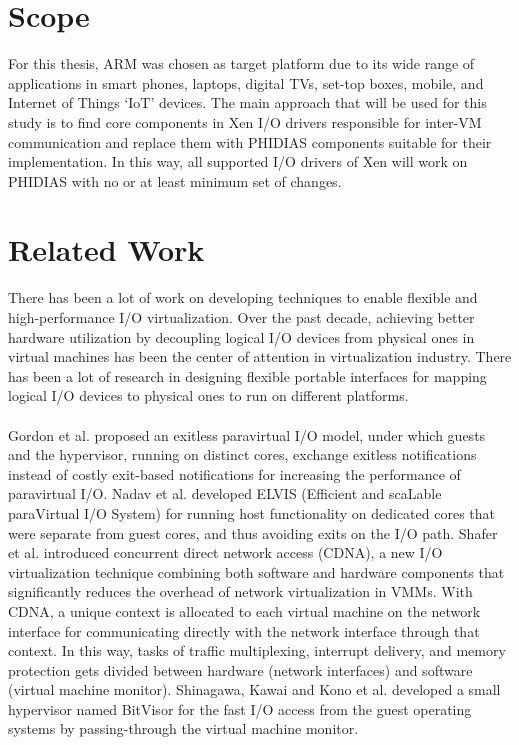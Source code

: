 \section{Scope\label{sec:scope}}
For this thesis, ARM was chosen as target platform due to its wide range of applications in smart phones, laptops, digital TVs, set-top boxes, mobile, and Internet of Things `IoT' devices. The main approach that will be used for this study is to find core components in Xen I/O drivers responsible for inter-VM communication and replace them with PHIDIAS components suitable for their implementation. In this way, all supported I/O drivers of Xen will work on PHIDIAS with no or at least minimum set of changes. 

\section{Related Work\label{sec:prework}}
There has been a lot of work on developing techniques to enable flexible and high-performance I/O virtualization. Over the past decade, achieving better hardware utilization by decoupling logical I/O devices from physical ones in virtual machines has been the center of attention in virtualization industry. There has been a lot of research in designing flexible portable interfaces for mapping logical I/O devices to physical ones to run on different platforms. 
\\
\\
Gordon et al. \cite{exitless} proposed an exitless paravirtual I/O model, under which guests and the hypervisor, running on distinct cores, exchange exitless notifications instead of costly exit-based notifications for increasing the performance of paravirtual I/O. Nadav et al. \cite{efficient}  developed ELVIS (Efficient and scaLable paraVirtual I/O System) for running host functionality on dedicated cores that were separate from guest cores, and thus avoiding exits on the I/O path. Shafer et al. \cite{CDNA} introduced concurrent direct network access (CDNA), a new I/O virtualization technique combining both software and hardware components that significantly reduces the overhead of network virtualization in VMMs. With CDNA, a unique context is allocated to each virtual machine on the network interface for communicating directly with the network interface through that context. In this way, tasks of traffic multiplexing, interrupt delivery, and memory protection gets divided between hardware (network interfaces) and software (virtual  machine monitor). Shinagawa, Kawai and Kono et al. \cite{bitvisor} developed a small hypervisor named BitVisor for the fast I/O access from the guest operating systems by passing-through the virtual machine monitor.
